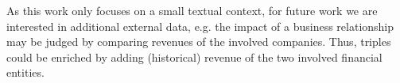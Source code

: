 As this work only focuses on a small textual context, for future work we are interested in additional external data, e.g. the impact of a business relationship may be judged by comparing revenues of the involved companies.
Thus, triples could be enriched by adding (historical) revenue of the two involved financial entities. 



%


